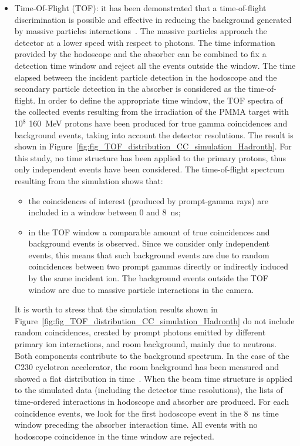 \begin{itemize}
\item Time-Of-Flight (TOF): it has been demonstrated that a time-of-flight discrimination is possible and effective in reducing the background generated by massive particles interactions~\cite{Testa:2010aa}. The massive particles approach the detector at a lower speed with respect to photons. The time information provided by the hodoscope and the absorber can be combined to fix a detection time window and reject all the events outside the window. The time elapsed between the incident particle detection in the hodoscope and the secondary particle detection in the absorber is considered as the time-of-flight. In order to define the appropriate time window, the TOF spectra of the collected events resulting from the irradiation of the PMMA target with 10$^{8}$ 160~MeV protons have been produced for true gamma coincidences and background events, taking into account the detector resolutions. The result is shown in Figure~\ref{fig:fig_TOF_distribution_CC_simulation_Hadronth}. For this study, no time structure has been applied to the primary protons, thus only independent events have been considered. The time-of-flight spectrum resulting from the simulation shows that:
\begin{itemize}
\item the coincidences of interest (produced by prompt-gamma rays) are included in a window between 0 and 8~ns;
\item in the TOF window a comparable amount of true coincidences and background events is observed. Since we consider only independent events, this means that such background events are due to random coincidences between two prompt gammas directly or indirectly induced by the same incident ion. The background events outside the TOF window are due to massive particle interactions in the camera.
\end{itemize}
It is worth to stress that the simulation results shown in Figure~\ref{fig:fig_TOF_distribution_CC_simulation_Hadronth} do not include random coincidences, created by prompt photons emitted by different primary ion interactions, and room background, mainly due to neutrons. Both components contribute to the background spectrum. In the case of the C230 cyclotron accelerator, the room background has been measured and showed a flat distribution in time~\cite{Pinto2014}. When the beam time structure is applied to the simulated data (including the detector time resolutions), the lists of time-ordered interactions in hodoscope and absorber are produced. For each coincidence events, we look for the first hodoscope event in the 8~ns time window preceding the absorber interaction time. All events with no hodoscope coincidence in the time window are rejected.


\end{itemize}
